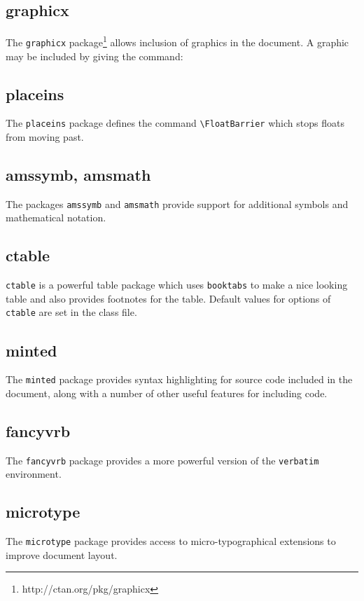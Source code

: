 \documentclass{adharticle} %
\begin{document}
\subsection{graphicx}

The \texttt{graphicx} package\footnote{http://ctan.org/pkg/graphicx} allows
inclusion of graphics in the document. A graphic may be included by giving the
command:

\subsection{placeins}

The \texttt{placeins} package defines the command
\texttt{\textbackslash{}FloatBarrier} which stops floats from moving past.

\subsection{amssymb, amsmath}

The packages \texttt{amssymb} and \texttt{amsmath} provide support for
additional symbols and mathematical notation.


\subsection{ctable}

\texttt{ctable} is a powerful table package which uses \texttt{booktabs} to make
a nice looking table and also provides footnotes for the table. Default values
for options of \texttt{ctable} are set in the class file.

\subsection{minted}

The \texttt{minted} package provides syntax highlighting for source code
included in the document, along with a number of other useful features for
including code.

\subsection{fancyvrb}

The \texttt{fancyvrb} package provides a more powerful version of the
\texttt{verbatim} environment.

\subsection{microtype}

The \texttt{microtype} package provides access to micro-typographical extensions
to improve document layout.
\end{document}
